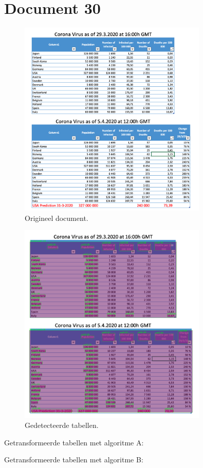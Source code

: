 \section{Document 30}

\begin{figure}[H]
    \centering
    \includegraphics[width=0.8\textwidth]{test-resultaten/30/original.png}
    \caption{Origineel document.}
\end{figure}

\begin{figure}[H]
    \centering
    \includegraphics[width=0.8\textwidth]{test-resultaten/30/detected_tables.png}
    \caption{Gedetecteerde tabellen.}
\end{figure}

Getransformeerde tabellen met algoritme A:

Getransformeerde tabellen met algoritme B:
